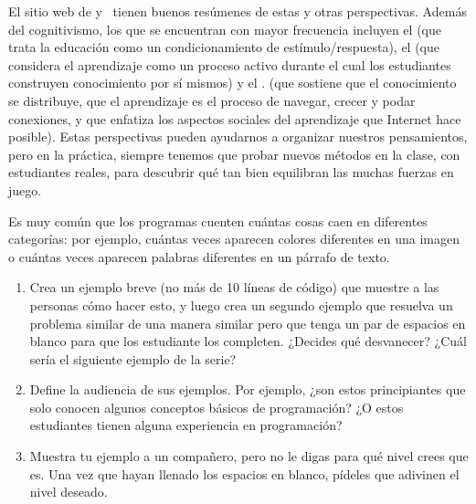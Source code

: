 El sitio web de  
y~\cite{Wibu2016} 
tienen buenos resúmenes de estas y otras perspectivas. 
Además del cognitivismo, los que se encuentran con mayor frecuencia incluyen el  
(que trata la educación como un condicionamiento de estímulo/respuesta), 
el  
(que considera el aprendizaje como un proceso activo durante el cual los estudiantes construyen conocimiento por sí mismos) 
y el .
(que sostiene que el conocimiento se distribuye, 
que el aprendizaje es el proceso de navegar, crecer y podar conexiones, 
y que enfatiza los aspectos sociales del aprendizaje que Internet hace posible). 
Estas perspectivas pueden ayudarnos a organizar nuestros pensamientos, 
pero en la práctica, 
siempre tenemos que probar nuevos métodos en la clase, 
con estudiantes reales, 
para descubrir qué tan bien equilibran las muchas fuerzas en juego.



Es muy común que los programas cuenten cuántas cosas caen en diferentes categorías: 
por ejemplo, 
cuántas veces aparecen colores diferentes en una imagen 
o cuántas veces aparecen palabras diferentes en un párrafo de texto.

\begin{enumerate}
\item
	Crea un ejemplo breve (no más de 10 líneas de código) que muestre a las personas cómo hacer esto, 
	y luego crea un segundo ejemplo que resuelva un problema similar de una manera similar 
	pero que tenga un par de espacios en blanco para que los estudiante los completen. 
	¿Decides qué desvanecer? 
	¿Cuál sería el siguiente ejemplo de la serie?

\item
	Define la audiencia de sus ejemplos. 
	Por ejemplo, 
	¿son estos principiantes que solo conocen algunos conceptos básicos de programación? 
	¿O estos estudiantes tienen alguna experiencia en programación?

\item
	Muestra tu ejemplo a un compañero, 
	pero no le digas para qué nivel crees que es. 
	Una vez que hayan llenado los espacios en blanco, 
	pídeles que adivinen el nivel deseado.

\end{enumerate}

